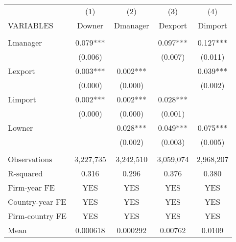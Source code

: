 \begin{tabular}{lcccc} \hline
 & (1) & (2) & (3) & (4) \\
VARIABLES & Downer & Dmanager & Dexport & Dimport \\ \hline
 &  &  &  &  \\
Lmanager & 0.079*** &  & 0.097*** & 0.127*** \\
 & (0.006) &  & (0.007) & (0.011) \\
Lexport & 0.003*** & 0.002*** &  & 0.039*** \\
 & (0.000) & (0.000) &  & (0.002) \\
Limport & 0.002*** & 0.002*** & 0.028*** &  \\
 & (0.000) & (0.000) & (0.001) &  \\
Lowner &  & 0.028*** & 0.049*** & 0.075*** \\
 &  & (0.002) & (0.003) & (0.005) \\
 &  &  &  &  \\
Observations & 3,227,735 & 3,242,510 & 3,059,074 & 2,968,207 \\
R-squared & 0.316 & 0.296 & 0.376 & 0.380 \\
Firm-year FE & YES & YES & YES & YES \\
Country-year FE & YES & YES & YES & YES \\
Firm-country FE & YES & YES & YES & YES \\
 Mean & 0.000618 & 0.000292 & 0.00762 & 0.0109 \\ \hline
\end{tabular}
